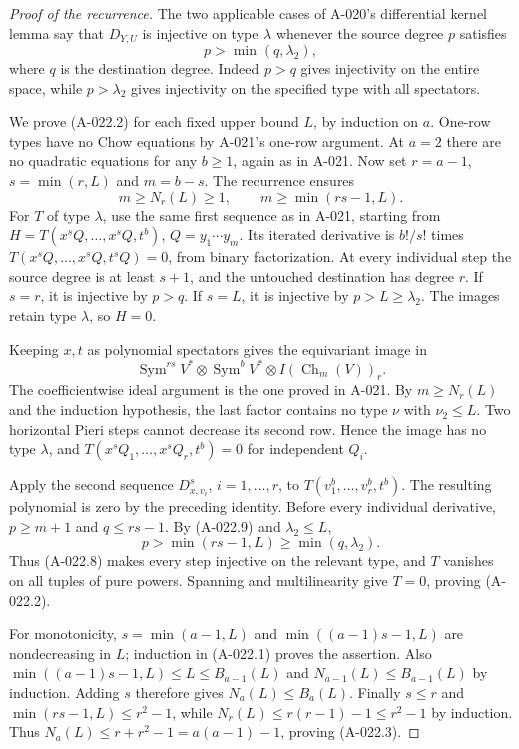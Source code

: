 \begin{proof}[Proof of the recurrence]
The two applicable cases of A-020's differential kernel lemma
say that $D_{Y,U}$ is injective on type $\lambda$ whenever
the source degree $p$ satisfies
\[
                            p>\min(q,\lambda_2),       \tag{A-022.8}
\]
where $q$ is the destination degree. Indeed $p>q$ gives
injectivity on the entire space, while $p>\lambda_2$ gives
injectivity on the specified type with all spectators.

We prove (A-022.2) for each fixed upper bound $L$, by induction
on $a$. One-row types have no Chow equations by A-021's
one-row argument. At $a=2$ there are no quadratic equations
for any $b\geq1$, again as in A-021. Now set $r=a-1$,
$s=\min(r,L)$ and $m=b-s$. The recurrence ensures
\[
       m\geq N_r(L)\geq1,
       \qquad m\geq\min(rs-1,L).                      \tag{A-022.9}
\]
For $T$ of type $\lambda$, use the same first sequence as
in A-021, starting from
$H=T(x^sQ,\ldots,x^sQ,t^b)$, $Q=y_1\cdots y_m$.
Its iterated derivative is $b!/s!$ times
$T(x^sQ,\ldots,x^sQ,t^sQ)=0$, from binary factorization.
At every individual step the source degree is at least
$s+1$, and the untouched destination has degree $r$.
If $s=r$, it is injective by $p>q$. If $s=L$, it is
injective by $p>L\geq\lambda_2$. The images retain type
$\lambda$, so $H=0$.

Keeping $x,t$ as polynomial spectators gives the equivariant
image in
\[
 \operatorname{Sym}^{rs}V^*\otimes\operatorname{Sym}^bV^*
                              \otimes I(\operatorname{Ch}_m(V))_r.
\]
The coefficientwise ideal argument is the one proved in A-021.
By $m\geq N_r(L)$ and the induction hypothesis, the last
factor contains no type $\nu$ with $\nu_2\leq L$.
Two horizontal Pieri steps cannot decrease its second row.
Hence the image has no type $\lambda$, and
$T(x^sQ_1,\ldots,x^sQ_r,t^b)=0$ for independent $Q_i$.

Apply the second sequence $D_{x,v_i}^s$, $i=1,\ldots,r$,
to $T(v_1^b,\ldots,v_r^b,t^b)$. The resulting polynomial
is zero by the preceding identity. Before every individual
derivative, $p\geq m+1$ and $q\leq rs-1$.
By (A-022.9) and $\lambda_2\leq L$,
\[
 p>\min(rs-1,L)\geq\min(q,\lambda_2).
\]
Thus (A-022.8) makes every step injective on the relevant
type, and $T$ vanishes on all tuples of pure powers. Spanning
and multilinearity give $T=0$, proving (A-022.2).

For monotonicity, $s=\min(a-1,L)$ and
$\min((a-1)s-1,L)$ are nondecreasing in $L$; induction
in (A-022.1) proves the assertion. Also
$\min((a-1)s-1,L)\leq L\leq B_{a-1}(L)$ and
$N_{a-1}(L)\leq B_{a-1}(L)$ by induction. Adding $s$
therefore gives $N_a(L)\leq B_a(L)$. Finally $s\leq r$
and $\min(rs-1,L)\leq r^2-1$, while
$N_r(L)\leq r(r-1)-1\leq r^2-1$ by induction.
Thus $N_a(L)\leq r+r^2-1=a(a-1)-1$, proving (A-022.3).
\end{proof}


